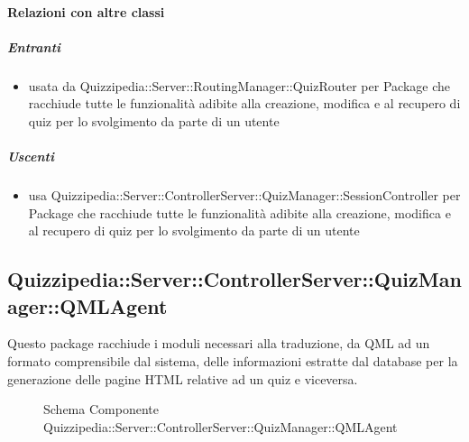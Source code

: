 \paragraph{Relazioni con altre classi}
\subparagraph{Entranti}
\begin{itemize}
\item usata da Quizzipedia::Server::RoutingManager::QuizRouter per Package che racchiude tutte le funzionalità adibite alla creazione, modifica e al recupero di quiz per lo svolgimento da parte di un utente
\end{itemize}
\subparagraph{Uscenti}
\begin{itemize}
\item usa Quizzipedia::Server::ControllerServer::QuizManager::SessionController per Package che racchiude tutte le funzionalità adibite alla creazione, modifica e al recupero di quiz per lo svolgimento da parte di un utente
\end{itemize}
\subsection{Quizzipedia::Server::ControllerServer::QuizManager::QMLAgent}
Questo package racchiude i moduli necessari alla traduzione, da QML ad un formato comprensibile dal sistema, delle informazioni estratte dal database per la generazione delle pagine HTML relative ad un quiz e viceversa.
\begin{figure}[H]
\centering
\noindent{}
\caption[Schema Componente Quizzipedia::Server::ControllerServer::QuizManager::QMLAgent]{Schema Componente Quizzipedia::Server::ControllerServer::QuizManager::QMLAgent}
\end{figure}
